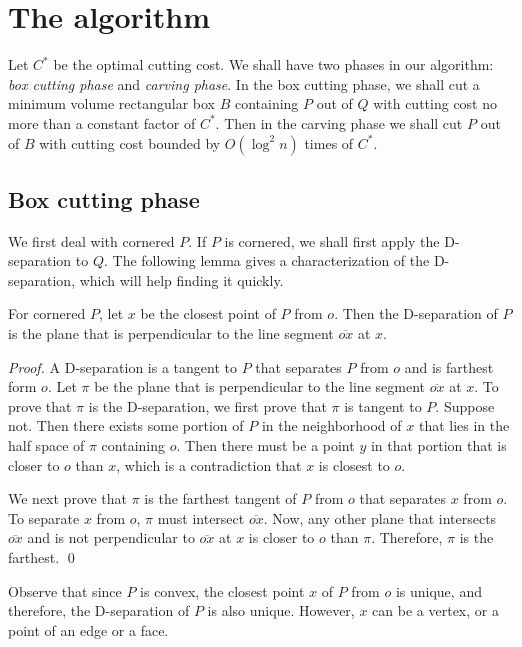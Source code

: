 \documentclass{llncs}
\begin{document}
\section{The algorithm} 
\label{se:algo}
Let $C^*$ be the optimal cutting cost.
We shall have two phases in our algorithm: \emph{box cutting phase} and \emph{carving phase}.
In the box cutting phase, we shall cut a minimum volume rectangular box $B$ containing $P$ out of $Q$
with cutting cost no more than a constant factor of $C^*$.
Then in the carving phase we shall cut $P$ out of $B$ with cutting cost bounded by $O(\log ^2n)$ times of $C^*$.


\subsection{Box cutting phase} 
We first deal with cornered $P$.
If $P$ is cornered, we shall first apply the D-separation to $Q$.
The following lemma gives a characterization of the D-separation, which will help finding it quickly.

\begin{lemma}
\label{le:closest_x}
For cornered $P$, let $x$ be the closest point of $P$ from $o$.
Then the D-separation of $P$ is the plane that is perpendicular to the line segment $\overline{ox}$ at $x$.
\end{lemma}

\begin{proof}
A D-separation is a tangent to $P$ that separates $P$ from $o$ and is farthest form $o$.
Let $\pi$ be the plane that is perpendicular to the line segment $\overline{ox}$ at $x$.
To prove that $\pi$ is the D-separation, we first prove that $\pi$ is tangent to $P$.
Suppose not. 
Then there exists some portion of $P$ in the neighborhood of $x$ that lies in the half space of $\pi$ containing $o$.
Then there must be a point $y$ in that portion that is closer to $o$ than $x$,
which is a contradiction that $x$ is closest to $o$.

We next prove that $\pi$ is the farthest tangent of $P$ from $o$ that separates $x$ from $o$.
To separate $x$ from $o$, $\pi$ must intersect $\overline{ox}$.
Now, any other plane that intersects $\overline{ox}$ and is not perpendicular to $\overline{ox}$ at $x$
is closer to $o$ than $\pi$.
Therefore, $\pi$ is the farthest.
\qed
\end{proof}

Observe that since $P$ is convex, the  closest point $x$ of $P$ from $o$ is unique,
and therefore, the D-separation of $P$ is also unique.
However, $x$ can be a vertex, or a point of an edge or a face.
\end{document}
